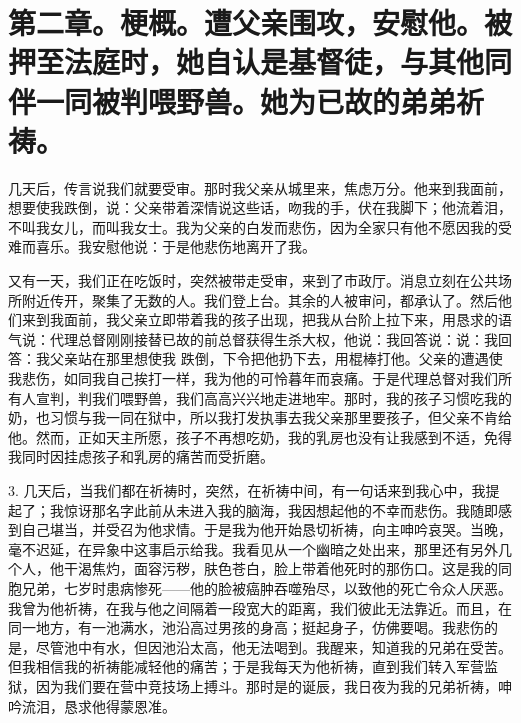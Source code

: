 
\section{第二章。梗概。遭父亲围攻，安慰他。被押至法庭时，她自认是基督徒，与其他同伴一同被判喂野兽。她为已故的弟弟祈祷。}

几天后，传言说我们就要受审。那时我父亲从城里来，焦虑万分。他来到我面前，想要使我跌倒，说：父亲带着深情说这些话，吻我的手，伏在我脚下；他流着泪，不叫我女儿，而叫我女士。我为父亲的白发而悲伤，因为全家只有他不愿因我的受难而喜乐。我安慰他说：于是他悲伤地离开了我。\par

又有一天，我们正在吃饭时，突然被带走受审，来到了市政厅。消息立刻在公共场所附近传开，聚集了无数的人。我们登上台。其余的人被审问，都承认了。然后他们来到我面前，我父亲立即带着我的孩子出现，把我从台阶上拉下来，用恳求的语气说：代理总督刚刚接替已故的前总督获得生杀大权，他说：我回答说：说：我回答：我父亲站在那里想使我  跌倒，下令把他扔下去，用棍棒打他。父亲的遭遇使我悲伤，如同我自己挨打一样，我为他的可怜暮年而哀痛。于是代理总督对我们所有人宣判，判我们喂野兽，我们高高兴兴地走进地牢。那时，我的孩子习惯吃我的奶，也习惯与我一同在狱中，所以我打发执事去我父亲那里要孩子，但父亲不肯给他。然而，正如天主所愿，孩子不再想吃奶，我的乳房也没有让我感到不适，免得我同时因挂虑孩子和乳房的痛苦而受折磨。\par

3. 几天后，当我们都在祈祷时，突然，在祈祷中间，有一句话来到我心中，我提起了；我惊讶那名字此前从未进入我的脑海，我因想起他的不幸而悲伤。我随即感到自己堪当，并受召为他求情。于是我为他开始恳切祈祷，向主呻吟哀哭。当晚，毫不迟延，在异象中这事启示给我。我看见从一个幽暗之处出来，那里还有另外几个人，他干渴焦灼，面容污秽，肤色苍白，脸上带着他死时的那伤口。这是我的同胞兄弟，七岁时患病惨死——他的脸被癌肿吞噬殆尽，以致他的死亡令众人厌恶。我曾为他祈祷，在我与他之间隔着一段宽大的距离，我们彼此无法靠近。而且，在同一地方，有一池满水，池沿高过男孩的身高；挺起身子，仿佛要喝。我悲伤的是，尽管池中有水，但因池沿太高，他无法喝到。我醒来，知道我的兄弟在受苦。但我相信我的祈祷能减轻他的痛苦；于是我每天为他祈祷，直到我们转入军营监狱，因为我们要在营中竞技场上搏斗。那时是的诞辰，我日夜为我的兄弟祈祷，呻吟流泪，恳求他得蒙恩准。\par

